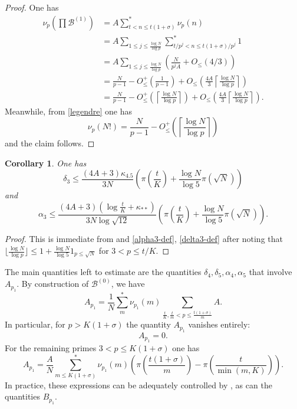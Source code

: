 \documentclass[10pt,a4paper,reqno]{amsart}
\numberwithin{equation}{section}
\theoremstyle{plain}
\newtheorem{corollary}[corollary]{Corollary}
\theoremstyle{definition}
\newcommand\tuple{{\mathcal B}}
\begin{document}
\begin{proof}
One has
  \begin{align*}
    \nu_p(\prod \tuple^{(1)}) &= A \sum_{t < n \leq t(1+\sigma)}^* \nu_p(n) \\
    &= A \sum_{1 \leq j \leq \frac{\log N}{\log p}} \sum_{t/p^j < n \leq t(1+\sigma)/p^j}^* 1 \\
    &= A \sum_{1 \leq j \leq \frac{\log N}{\log p}} \left(\frac{N}{p^j A} + O_{\leq}(4/3)\right) \\
    &= \frac{N}{p-1} - O_{\leq}^+\left(\frac{1}{p-1}\right)
    + O_{\leq}\left(\frac{4A}{3} \left\lceil \frac{\log N}{\log p}  \right\rceil\right) \\
    &= \frac{N}{p-1}
    - O_{\leq}^+\left(\left\lceil \frac{\log N}{\log p}  \right\rceil\right)
    + O_{\leq}\left(\frac{4A}{3} \left\lceil \frac{\log N}{\log p}  \right\rceil\right).
  \end{align*}
  Meanwhile, from \eqref{legendre} one has
  $$ \nu_p(N!) = \frac{N}{p-1} - O_{\leq}^+\left(\left\lceil \frac{\log N}{\log p}  \right\rceil\right)$$
and the claim follows.
\end{proof}

\begin{corollary}\label{delta3-alpha3-bound} One has
$$ \delta_3 \leq \frac{(4A+3)\kappa_{4.5}}{3N} \left(\pi\left(\frac{t}{K} \right) + \frac{\log N}{\log 5} \pi\left(\sqrt{N}\right)\right)$$
and
$$ \alpha_3 \leq \frac{(4A+3) \left(\log \frac{t}{K} + \kappa_{**}\right)}{3N\log \sqrt{12}}  \left(\pi\left(\frac{t}{K} \right) + \frac{\log N}{\log 5} \pi\left(\sqrt{N}\right)\right).$$
\end{corollary}

\begin{proof} This is immediate from  and \eqref{alpha3-def}, \eqref{delta3-def} after noting that $\lfloor \frac{\log N}{\log p} \rfloor \leq 1 + \frac{\log N}{\log 5} 1_{p \leq \sqrt{N}}$ for $3 < p \leq t/K$.
\end{proof}

The main quantities left to estimate are the quantities $\delta_4, \delta_5, \alpha_4, \alpha_5$ that involve $A_{p_1}$.  By construction of $\tuple^{(0)}$, we have
$$
A_{p_1} = \frac{1}{N} \sum_m^* \nu_{p_1}(m) \sum_{\frac{t}{K}, \frac{t}{m} < p \leq \frac{t(1+\sigma)}{m}} A.
$$
In particular, for $p > K(1+\sigma)$ the quantity $A_{p_1}$ vanishes entirely:
\begin{equation}\label{ap1-vanish}
  A_{p_1} = 0.
\end{equation}
For the remaining primes $3 < p \leq K(1+\sigma)$ one has
\begin{equation}\label{ap1-small}
A_{p_1} = \frac{A}{N} \sum_{m \leq K(1+\sigma)}^* \nu_{p_1}(m) \left( \pi\left(\frac{t(1+\sigma)}{m}\right) - \pi\left(\frac{t}{\min(m,K)} \right) \right).
\end{equation}
In practice, these expressions can be adequately controlled by , as can the quantities $B_{p_1}$.
\end{document}
